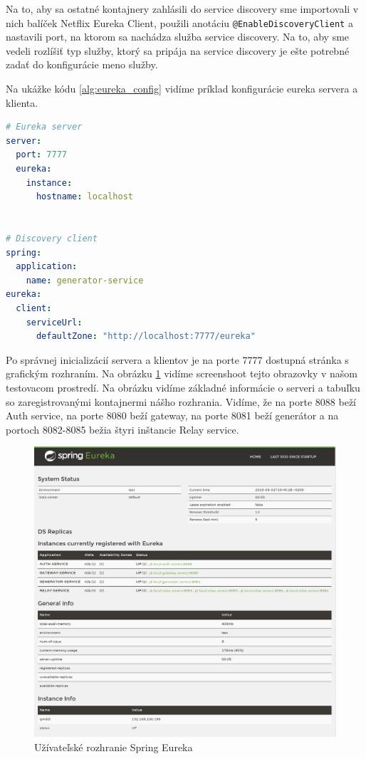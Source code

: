 Na to, aby sa ostatné kontajnery zahlásili do service discovery sme importovali v nich balíček Netflix Eureka Client, použili anotáciu \texttt{@EnableDiscoveryClient} a nastavili port, na ktorom sa nachádza služba service discovery. Na to, aby sme vedeli rozlíšiť typ služby, ktorý sa pripája na service discovery je ešte potrebné zadať do konfigurácie meno služby.

Na ukážke kódu \ref{alg:eureka_config} vidíme príklad konfigurácie eureka servera a klienta.

\begin{lstlisting}[float, caption={Konfigurácia Eureka servera a klienta},label={alg:eureka_config},language=yaml]
# Eureka server
server:
  port: 7777
  eureka:
	instance:
	  hostname: localhost
			

# Discovery client	
spring:
  application:
	name: generator-service
eureka:
  client:
	serviceUrl:
	  defaultZone: "http://localhost:7777/eureka"
\end{lstlisting}

Po správnej inicializácií servera a klientov je na porte 7777 dostupná stránka s grafickým rozhraním. Na obrázku \ref{eureka_gui} vidíme screenshoot tejto obrazovky v našom testovacom prostredí. Na obrázku vidíme základné informácie o serveri a tabuľku so zaregistrovanými kontajnermi nášho rozhrania. Vidíme, že na porte 8088 beží Auth service, na porte 8080 beží gateway, na porte 8081 beží generátor a na portoch 8082-8085 bežia štyri inštancie Relay service.

\begin{figure}[!htbp]
	\centering
	\includegraphics[width=16cm]{img/eureka_gui.png}
	\caption{Užívateľské rozhranie Spring Eureka}
	\label{eureka_gui}
\end{figure}

